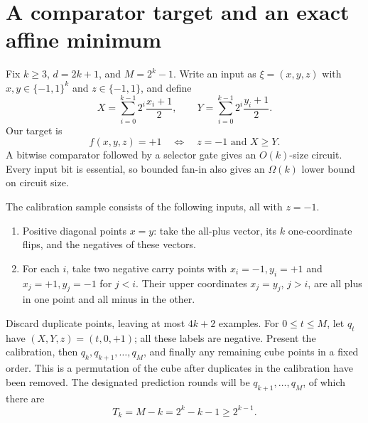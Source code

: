 \section{A comparator target and an exact affine minimum}
\label{sec:selector}

Fix $k\ge3$, $d=2k+1$, and $M=2^k-1$. Write an input as
$\xi=(x,y,z)$ with $x,y\in\{-1,1\}^k$ and $z\in\{-1,1\}$, and define
\[
 X=\sum_{i=0}^{k-1}2^i\frac{x_i+1}{2},\qquad
 Y=\sum_{i=0}^{k-1}2^i\frac{y_i+1}{2}.
\]
Our target is
\begin{equation}\label{eq:target}
 f(x,y,z)=+1\quad\Longleftrightarrow\quad z=-1\text{ and }X\ge Y.
\end{equation}
A bitwise comparator followed by a selector gate gives an $O(k)$-size
circuit. Every input bit is essential, so bounded fan-in also gives an
$\Omega(k)$ lower bound on circuit size.

The calibration sample consists of the following inputs, all with $z=-1$.
\begin{enumerate}
\item Positive diagonal points $x=y$: take the all-plus vector, its $k$
one-coordinate flips, and the negatives of these vectors.
\item For each $i$, take two negative carry points with
$x_i=-1,y_i=+1$ and $x_j=+1,y_j=-1$ for $j<i$. Their upper coordinates
$x_j=y_j$, $j>i$, are all plus in one point and all minus in the other.
\end{enumerate}
Discard duplicate points, leaving at most $4k+2$ examples.
For $0\le t\le M$, let $q_t$ have $(X,Y,z)=(t,0,+1)$; all these labels
are negative. Present the calibration, then
$q_k,q_{k+1},\ldots,q_M$, and finally any remaining cube points in a
fixed order. This is a permutation of the cube after duplicates in the
calibration have been removed. The designated prediction rounds will be
$q_{k+1},\ldots,q_M$, of which there are
\begin{equation}\label{eq:mistakes}
 T_k=M-k=2^k-k-1\ge2^{k-1}.
\end{equation}

